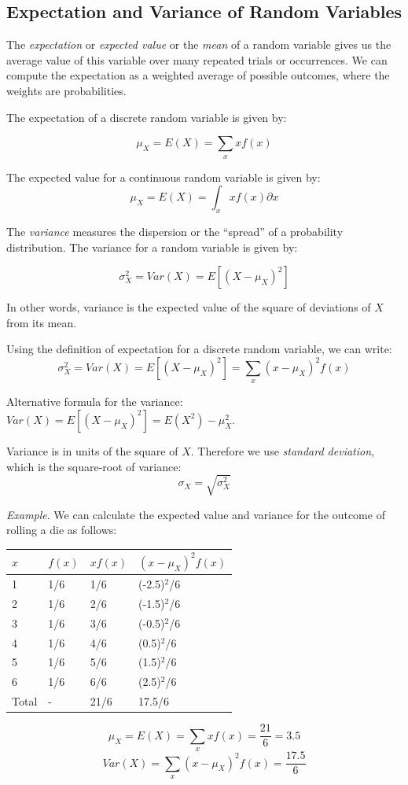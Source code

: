 \documentclass{./../../Latex/handout}
\begin{document}
\subsection{Expectation and Variance of Random Variables}

The \textit{expectation} or \textit{expected value} or the \textit{mean} of a random variable gives us the average value of this variable over many repeated trials or occurrences. We can compute the expectation as a weighted average of possible outcomes, where the weights are probabilities.  

The expectation of a discrete random variable is given by:

$$ \mu_X = E(X) = \sum_x x f(x) $$

The expected value for a continuous random variable is given by:
$$ \mu_X = E(X) = \int_x x f(x) \partial x $$

The \textit{variance} measures the dispersion or the ``spread'' of a
probability distribution. The variance for a random variable is given by:

$$\sigma_X^2 = Var(X) = E [(X-\mu_X)^2]   $$ 

In other words, variance is the expected value of the square of deviations of $X$ from its mean. 

Using the definition of expectation for a discrete random variable, we can write:
$$\sigma_X^2 = Var(X) = E [(X-\mu_X)^2] = \sum_x (x-\mu_X)^2 f(x)  $$ 

Alternative formula for the variance:  $Var(X) = E[(X-\mu_X)^2] = E(X^2)-\mu_X^2$.

Variance is in units of the square of $X$. Therefore we use \textit{standard deviation}, which is the square-root of variance:
$$\sigma_X = \sqrt{\sigma_X^2}$$ 


\textit{Example}. We can calculate the expected value and variance for the outcome of rolling a die as follows:
\begin{center}
\begin{tabularx}{0.75\textwidth}{XXXX}
\toprule
$x$ & $f(x)$ & $xf(x)$ & $(x-\mu_X)^2 f(x)$ \\ 
\midrule
1 & 1/6 & 1/6 & (-2.5)$^2$/6 \\
2 & 1/6 & 2/6 & (-1.5)$^2$/6 \\
3 & 1/6 & 3/6 & (-0.5)$^2$/6 \\
4 & 1/6 & 4/6 & (0.5)$^2$/6 \\
5 & 1/6 & 5/6 & (1.5)$^2$/6 \\
6 & 1/6 & 6/6 & (2.5)$^2$/6 \\ \midrule
Total & - & 21/6 & 17.5/6 \\
\bottomrule
\end{tabularx}
\end{center}
$$ \mu_X = E(X) = \sum_{x} xf(x) = \frac{21}{6} = 3.5 $$ 
$$ Var(X) = \sum_x (x-\mu_X)^2 f(x) = \frac{17.5}{6} $$ 
\end{document}
